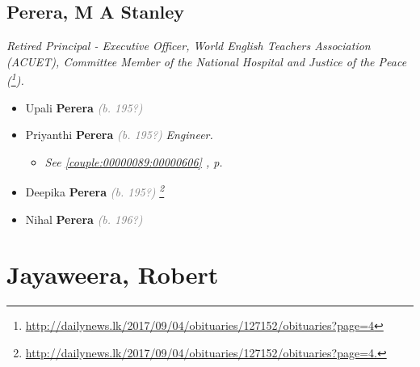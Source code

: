 \documentclass[10pt, openany]{book}
\begin{document}
\chapter{Perera, M A Stanley}
\label{00002491}
\textcolor{slmaroon}{\textit{Retired Principal - Executive Officer, World English Teachers Association (ACUET), Committee Member of the National Hospital and Justice of the Peace (\footnote{\url{http://dailynews.lk/2017/09/04/obituaries/127152/obituaries?page=4}}).}}
\begin{itemize}
\item{Upali \textbf{Perera} \textcolor{gray}{\textit{(b. 195?)}}
 }
\item{Priyanthi \textbf{Perera} \textcolor{gray}{\textit{(b. 195?)}} \textcolor{slmaroon}{\textit{Engineer.}}
\begin{itemize}
\item{\textcolor{slteal}{\textit{See  \autoref{couple:00000089:00000606} \textit{, p. \pageref{couple:00000089:00000606} }}}}
\end{itemize}
 }
\item{Deepika \textbf{Perera} \textcolor{gray}{\textit{(b. 195?)}} \textcolor{slmaroon}{\textit{\footnote{\url{http://dailynews.lk/2017/09/04/obituaries/127152/obituaries?page=4.}}}}
 }
\item{Nihal \textbf{Perera} \textcolor{gray}{\textit{(b. 196?)}}
 }
\end{itemize}
   
\part{Jayaweera, Robert}
\end{document}
